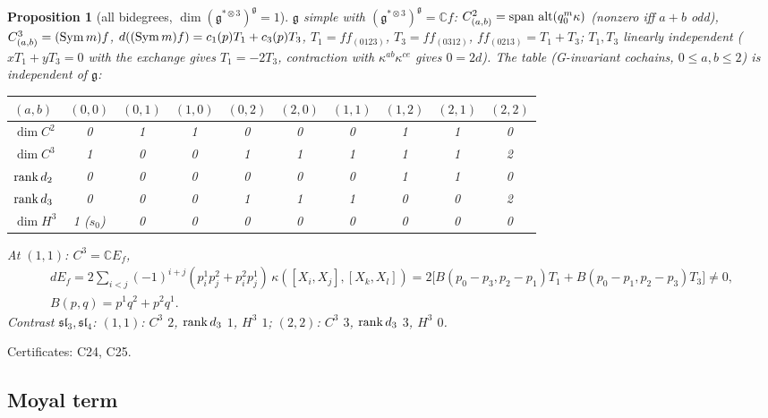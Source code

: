 \documentclass[10pt,a4paper]{article}
\numberwithin{equation}{section}
\newtheorem{proposition}[theorem]{Proposition}
\theoremstyle{definition}
\theoremstyle{remark}
\newcommand{\alt}{\operatorname{alt}}
\newcommand{\g}{\mathfrak g}
\newcommand{\fsl}{\mathfrak{sl}}
\newcommand{\cert}[1]{\par\noindent\textup{Certificates: #1.}\par}
\begin{document}
\begin{proposition}[all bidegrees, $\dim(\g^{*\otimes3})^\g=1$]\label{prop-H3all}
$\g$ simple with $(\g^{*\otimes3})^\g=\mathbb Cf$: $C^2_{(a,b)}={\rm span}\,\alt(q_0^m\kappa)$ (nonzero iff $a+b$ odd), $C^3_{(a,b)}=({\rm Sym}\,m)f$, $d(({\rm Sym}\,m)f)=c_1(p)T_1+c_3(p)T_3$, $T_1=ff_{(0123)}$, $T_3=ff_{(0312)}$, $ff_{(0213)}=T_1+T_3$; $T_1,T_3$ linearly independent ($xT_1+yT_3=0$ with the exchange gives $T_1=-2T_3$, contraction with $\kappa^{ab}\kappa^{ce}$ gives $0=2d$). The table (G-invariant cochains, $0\le a,b\le2$) is independent of $\g$:
\begin{center}
\begin{tabular}{@{}lccccccccc@{}}
\toprule
$(a,b)$ & $(0,0)$ & $(0,1)$ & $(1,0)$ & $(0,2)$ & $(2,0)$ & $(1,1)$ & $(1,2)$ & $(2,1)$ & $(2,2)$\\
\midrule
$\dim C^2$ & 0&1&1&0&0&0&1&1&0\\
$\dim C^3$ & 1&0&0&1&1&1&1&1&2\\
${\rm rank}\,d_2$ & 0&0&0&0&0&0&1&1&0\\
${\rm rank}\,d_3$ & 0&0&0&1&1&1&0&0&2\\
$\dim H^3$ & 1 ($s_0$)&0&0&0&0&0&0&0&0\\
\bottomrule
\end{tabular}
\end{center}
At $(1,1)$: $C^3=\mathbb CE_f$,
\begin{equation}
\begin{gathered}dE_f=2\sum_{i<j}(-1)^{i+j}(p_i^1p_j^2+p_i^2p_j^1)\,\kappa([X_i,X_j],[X_k,X_l])=2\big[B(p_0-p_3,p_2-p_1)T_1+B(p_0-p_1,p_2-p_3)T_3\big]\neq0,\\ B(p,q)=p^1q^2+p^2q^1 .\end{gathered}
\end{equation}
Contrast $\fsl_3,\fsl_4$: $(1,1)$: $C^3$ $2$, ${\rm rank}\,d_3$ $1$, $H^3$ $1$; $(2,2)$: $C^3$ $3$, ${\rm rank}\,d_3$ $3$, $H^3$ $0$.
\end{proposition}
\cert{C24, C25}

\subsection{Moyal term}
\end{document}
